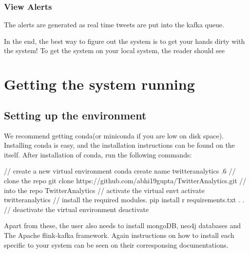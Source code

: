 \documentclass[letterpaper,10pt,english]{sphinxmanual}
\begin{document}
\noindent{}


\subsection{View Alerts}
\label{\detokenize{dashboard_website:view-alerts}}
The alerts are generated as real time tweets are put into the kafka queue.

\noindent{}

In the end, the best way to figure out the system is to get your hands dirty with the system! To get the system on your local system, the reader should see {\hyperref[\detokenize{running:getting-the-system-running}]{}}


\chapter{Getting the system running}
\label{\detokenize{running:getting-the-system-running}}\label{\detokenize{running::doc}}

\section{Setting up the environment}
\label{\detokenize{running:setting-up-the-environment}}
We recommend getting conda(or miniconda if you are low on disk space). Installing conda is easy, and the installation instructions can be found on the  itself. After installation of conda, run the following commands:

%
\begin{sphinxVerbatim}[commandchars=\\\{\}]
// create a new virtual environment
conda create \PYGZhy{}\PYGZhy{}name twitter\PYGZus{}analytics .6
// clone the repo
git clone https://github.com/abhi19gupta/TwitterAnalytics.git
//  into the repo
 TwitterAnalytics
// activate the virtual envt
 activate twitter\PYGZus{}analytics
// install the required modules.
pip install \PYGZhy{}r requirements.txt
.
.
// deactivate the virtual environment
 deactivate
\end{sphinxVerbatim}

Apart from these, the user also needs to install mongoDB, neo4j databases and The Apache flink-kafka framework. Again instructions on how to install each specific to your system can be seen on their corresponsing documentations.
\end{document}
